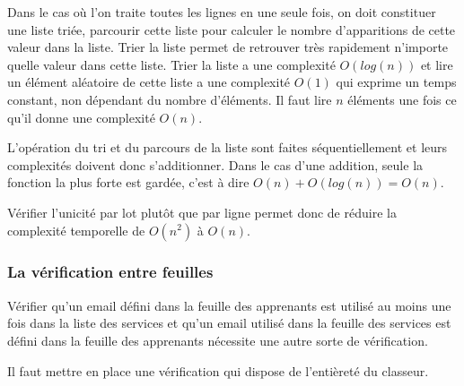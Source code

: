 Dans le cas où l'on traite toutes les lignes en une seule fois, on doit constituer une liste triée, parcourir cette liste pour calculer le nombre d'apparitions de cette valeur dans la liste.
Trier la liste permet de retrouver très rapidement n'importe quelle valeur dans cette liste.
Trier la liste a une complexité $O(log(n))$ et lire un élément aléatoire de cette liste a une complexité $O(1)$ qui exprime un temps constant, non dépendant du nombre d'éléments.
Il faut lire $n$ éléments une fois ce qu'il donne une complexité $O(n)$.

L'opération du tri et du parcours de la liste sont faites séquentiellement et leurs complexités doivent donc s'additionner.
Dans le cas d'une addition, seule la fonction la plus forte est gardée, c'est à dire $O(n) + O(log(n)) = O(n)$.

Vérifier l'unicité par lot plutôt que par ligne permet donc de réduire la complexité temporelle de $O(n^2)$ à $O(n)$.

\subsubsection{La vérification entre feuilles}
Vérifier qu'un email défini dans la feuille des apprenants est utilisé au moins une fois dans la liste des services et qu'un email utilisé dans la feuille des services est défini dans la feuille des apprenants nécessite une autre sorte de vérification.

Il faut mettre en place une vérification qui dispose de l'entièreté du classeur.
